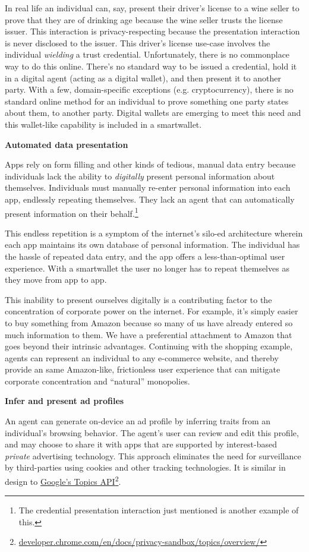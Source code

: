 \documentclass[11pt, oneside]{article}   	%
\newcommand{\hyperfootnote}[1][]{\def\ArgI{{#1}}\hyperfootnoteRelay}
\newcommand\hyperfootnoteRelay[2][]{\href{#1#2}{\ArgI}\footnote{\href{#1#2}{#2}}}
\begin{document}
In real life an individual can, say, present their driver's license to a wine seller to prove that they are of drinking age because the wine seller trusts the license issuer. This interaction is privacy-respecting because the presentation interaction is never disclosed to the issuer. This driver's license use-case involves the individual \emph{wielding} a trust credential. Unfortunately, there is no commonplace way to do this online. There's no standard way to be issued a credential, hold it in a digital agent (acting as a digital wallet), and then present it to another party. With a few, domain-specific exceptions (e.g. cryptocurrency), there is no standard online method for an individual to prove something one party states about them, to another party. Digital wallets are emerging to meet this need and this wallet-like capability is included in a smartwallet.

\textbf{Automated data presentation}

Apps rely on form filling and other kinds of tedious, manual data entry because individuals lack the ability to \emph{digitally} present personal information about themselves. Individuals must manually re-enter personal information into each app, endlessly repeating themselves. They lack an agent that can automatically present information on their behalf.\footnote{The credential presentation interaction just mentioned is another example of this.} 

This endless repetition is a symptom of the internet's silo-ed architecture wherein each app maintains its own database of personal information. The individual has the hassle of repeated data entry, and the app offers a less-than-optimal user experience. With a smartwallet the user no longer has to repeat themselves as they move from app to app.

This inability to present ourselves digitally is a contributing factor to the concentration of corporate power on the internet. For example, it's simply easier to buy something from Amazon because so many of us have already entered so much information to them. We have a preferential attachment to Amazon that goes beyond their intrinsic advantages. Continuing with the shopping example, agents can represent an individual to any e-commerce website, and thereby provide an same Amazon-like, frictionless user experience that can mitigate corporate concentration and ``natural'' monopolies. 

\textbf{Infer and present ad profiles}

An agent can generate on-device an ad profile by inferring traits from an individual's browsing behavior. The agent's user can review and edit this profile, and may choose to share it with apps that are supported by interest-based \emph{private} advertising technology. This approach eliminates the need for surveillance by third-parties using cookies and other tracking technologies. It is similar in design to \hyperfootnote[Google's Topics API][https://]{developer.chrome.com/en/docs/privacy-sandbox/topics/overview/}.
\end{document}

